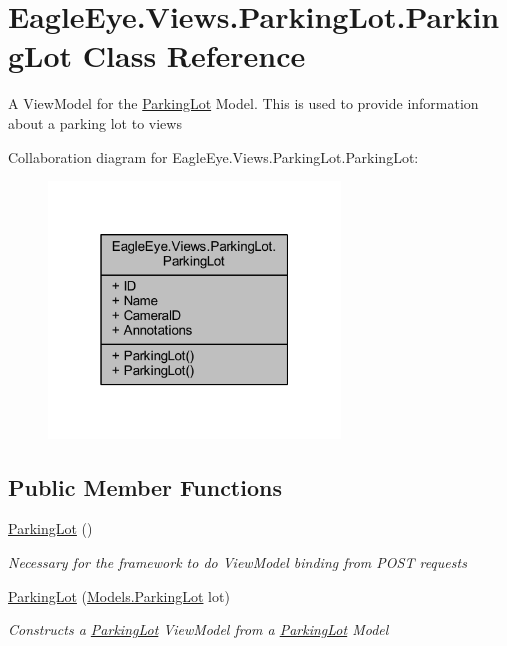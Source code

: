 \hypertarget{class_eagle_eye_1_1_views_1_1_parking_lot_1_1_parking_lot}{}\section{Eagle\+Eye.\+Views.\+Parking\+Lot.\+Parking\+Lot Class Reference}
\label{class_eagle_eye_1_1_views_1_1_parking_lot_1_1_parking_lot}


A View\+Model for the \mbox{\hyperlink{class_eagle_eye_1_1_views_1_1_parking_lot_1_1_parking_lot}{Parking\+Lot}} Model. This is used to provide information about a parking lot to views  




Collaboration diagram for Eagle\+Eye.\+Views.\+Parking\+Lot.\+Parking\+Lot\+:\nopagebreak
\begin{figure}[H]
\begin{center}
\leavevmode
\includegraphics[width=220pt]{class_eagle_eye_1_1_views_1_1_parking_lot_1_1_parking_lot__coll__graph}
\end{center}
\end{figure}
\subsection*{Public Member Functions}
\begin{DoxyCompactItemize}
\item 
\mbox{\hyperlink{class_eagle_eye_1_1_views_1_1_parking_lot_1_1_parking_lot_ab1048c32ed1b8cfa5e06f8cd9f614e03}{Parking\+Lot}} ()
\begin{DoxyCompactList}\small\item\em Necessary for the framework to do View\+Model binding from P\+O\+ST requests \end{DoxyCompactList}\item 
\mbox{\hyperlink{class_eagle_eye_1_1_views_1_1_parking_lot_1_1_parking_lot_a59da91cf482ad49cc2ff6ac1ea051f7f}{Parking\+Lot}} (\mbox{\hyperlink{class_eagle_eye_1_1_models_1_1_parking_lot}{Models.\+Parking\+Lot}} lot)
\begin{DoxyCompactList}\small\item\em Constructs a \mbox{\hyperlink{class_eagle_eye_1_1_views_1_1_parking_lot_1_1_parking_lot}{Parking\+Lot}} View\+Model from a \mbox{\hyperlink{class_eagle_eye_1_1_views_1_1_parking_lot_1_1_parking_lot}{Parking\+Lot}} Model \end{DoxyCompactList}\end{DoxyCompactItemize}
